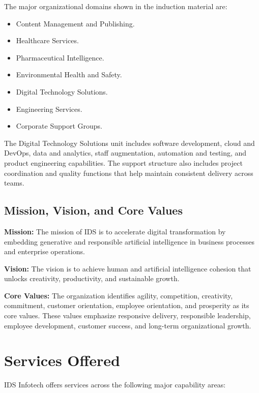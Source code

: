 \documentclass[12pt,a4paper]{report}
\begin{document}
The major organizational domains shown in the induction material are:
\begin{itemize}
    \item Content Management and Publishing.
    \item Healthcare Services.
    \item Pharmaceutical Intelligence.
    \item Environmental Health and Safety.
    \item Digital Technology Solutions.
    \item Engineering Services.
    \item Corporate Support Groups.
\end{itemize}

The Digital Technology Solutions unit includes software development, cloud and DevOps,
data and analytics, staff augmentation, automation and testing, and product engineering
capabilities. The support structure also includes project coordination and quality functions
that help maintain consistent delivery across teams.

\subsection{Mission, Vision, and Core Values}
\label{subsec:mission-vision-values}
\textbf{Mission:} The mission of IDS is to accelerate digital transformation by embedding
generative and responsible artificial intelligence in business processes and enterprise
operations.

\textbf{Vision:} The vision is to achieve human and artificial intelligence cohesion that
unlocks creativity, productivity, and sustainable growth.

\textbf{Core Values:} The organization identifies agility, competition, creativity,
commitment, customer orientation, employee orientation, and prosperity as its core values.
These values emphasize responsive delivery, responsible leadership, employee development,
customer success, and long-term organizational growth.

\section{Services Offered}
\label{sec:services-offered}
IDS Infotech offers services across the following major capability areas:
\end{document}
